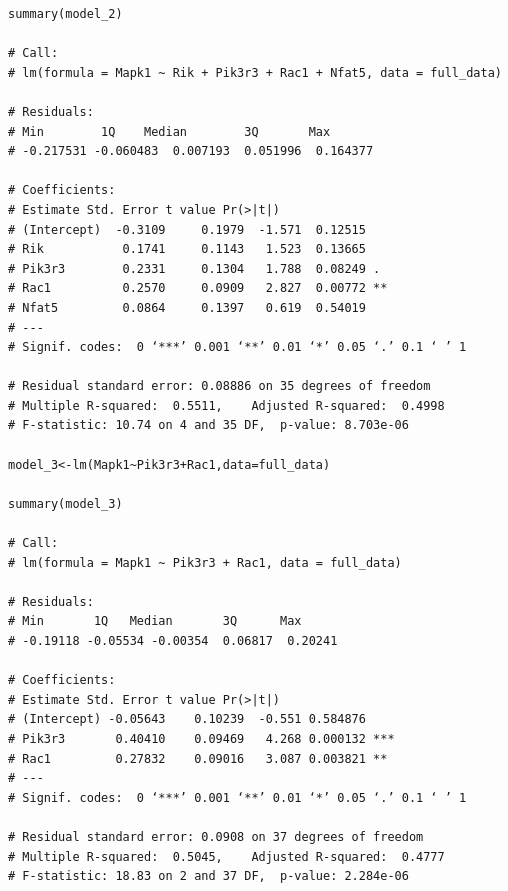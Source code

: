 \documentclass{article}
\begin{document}
\begin{lstlisting}[frame=single,style=base]
summary(model_2)

# Call:
# lm(formula = Mapk1 ~ Rik + Pik3r3 + Rac1 + Nfat5, data = full_data)

# Residuals:
# Min        1Q    Median        3Q       Max 
# -0.217531 -0.060483  0.007193  0.051996  0.164377 

# Coefficients:
# Estimate Std. Error t value Pr(>|t|)   
# (Intercept)  -0.3109     0.1979  -1.571  0.12515   
# Rik           0.1741     0.1143   1.523  0.13665   
# Pik3r3        0.2331     0.1304   1.788  0.08249 . 
# Rac1          0.2570     0.0909   2.827  0.00772 **
# Nfat5         0.0864     0.1397   0.619  0.54019   
# ---
# Signif. codes:  0 ‘***’ 0.001 ‘**’ 0.01 ‘*’ 0.05 ‘.’ 0.1 ‘ ’ 1

# Residual standard error: 0.08886 on 35 degrees of freedom
# Multiple R-squared:  0.5511,    Adjusted R-squared:  0.4998 
# F-statistic: 10.74 on 4 and 35 DF,  p-value: 8.703e-06

model_3<-lm(Mapk1~Pik3r3+Rac1,data=full_data)

summary(model_3)

# Call:
# lm(formula = Mapk1 ~ Pik3r3 + Rac1, data = full_data)

# Residuals:
# Min       1Q   Median       3Q      Max 
# -0.19118 -0.05534 -0.00354  0.06817  0.20241 

# Coefficients:
# Estimate Std. Error t value Pr(>|t|)    
# (Intercept) -0.05643    0.10239  -0.551 0.584876    
# Pik3r3       0.40410    0.09469   4.268 0.000132 ***
# Rac1         0.27832    0.09016   3.087 0.003821 ** 
# ---
# Signif. codes:  0 ‘***’ 0.001 ‘**’ 0.01 ‘*’ 0.05 ‘.’ 0.1 ‘ ’ 1

# Residual standard error: 0.0908 on 37 degrees of freedom
# Multiple R-squared:  0.5045,    Adjusted R-squared:  0.4777 
# F-statistic: 18.83 on 2 and 37 DF,  p-value: 2.284e-06
\end{lstlisting}
\end{document}
